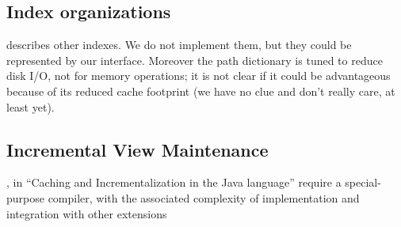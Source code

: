 \documentclass[preprint,authoryear,10pt]{sigplanconf}
\begin{document}
\subsection{Index organizations}

\citet{Lee98} describes other indexes. We do not implement them, but
they could be represented by our interface. Moreover the path dictionary
is tuned to reduce disk I/O, not for memory operations; it is not clear
if it could be advantageous because of its reduced cache footprint (we
have no clue and don't really care, at least yet).

\subsection{Incremental View Maintenance}

\citet{Willis08}, in ``Caching and Incrementalization in the Java
language''
require a special-purpose
compiler, with the associated complexity of implementation and
integration with other extensions
\end{document}
